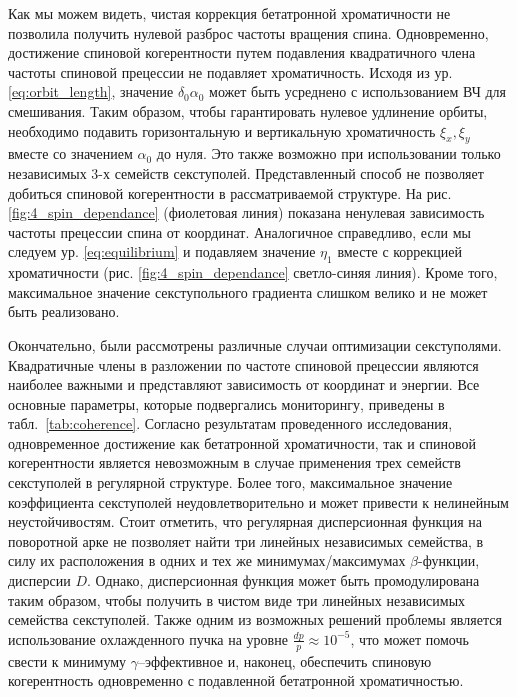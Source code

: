 \par Как мы можем видеть, чистая коррекция бетатронной хроматичности не позволила получить нулевой разброс частоты вращения спина. Одновременно, достижение спиновой когерентности путем подавления квадратичного члена частоты спиновой прецессии не подавляет хроматичность. Исходя из ур. \ref{eq:orbit_length}, значение $\delta_0\alpha_0$ может быть усреднено с использованием ВЧ для смешивания. Таким образом, чтобы гарантировать нулевое удлинение орбиты, необходимо подавить горизонтальную и вертикальную хроматичность $\xi_x,\xi_y$ вместе со значением $\alpha_0$ до нуля. Это также возможно при использовании только независимых 3-х семейств секступолей. Представленный способ не позволяет добиться спиновой когерентности в рассматриваемой структуре. На рис. \ref{fig:4_spin_dependance} (фиолетовая линия) показана ненулевая зависимость частоты прецессии спина от координат. Аналогичное справедливо, если мы следуем ур. \ref{eq:equilibrium} и подавляем значение $\eta_1$ вместе с коррекцией хроматичности (рис. \ref{fig:4_spin_dependance} светло-синяя линия). Кроме того, максимальное значение секступольного градиента слишком велико и не может быть реализовано.

\par Окончательно, были рассмотрены различные случаи оптимизации секступолями. Квадратичные члены в разложении по частоте спиновой прецессии являются наиболее важными и представляют зависимость от координат и энергии. Все основные параметры, которые подвергались мониторингу, приведены в табл.~\ref{tab:coherence}. Согласно результатам проведенного исследования, одновременное достижение как бетатронной хроматичности, так и спиновой когерентности  является невозможным в случае применения трех семейств секступолей в регулярной структуре. Более того, максимальное значение коэффициента секступолей неудовлетворительно и может привести к нелинейным неустойчивостям. Стоит отметить, что регулярная дисперсионная функция на поворотной арке не позволяет найти три линейных независимых семейства, в силу их расположения в одних и тех же минимумах/максимумах $\beta$-функции, дисперсии $D$. Однако, дисперсионная функция может быть промодулирована таким образом, чтобы получить в чистом виде три линейных независимых семейства секступолей. Также одним из возможных решений проблемы является использование охлажденного пучка на уровне $\frac{dp}{p}\approx{10}^{-5}$, что может помочь свести к минимуму $\gamma$–эффективное и, наконец, обеспечить спиновую когерентность одновременно с подавленной бетатронной хроматичностью.

